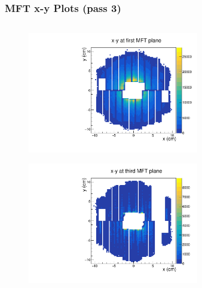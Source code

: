 \documentclass[10pt]{beamer}
\begin{document}
\begin{frame}
    \frametitle{MFT x-y Plots (pass 3)}

    \begin{columns}[T]
        \begin{column}{0.5\textwidth}
            \vspace*{-0.5cm}
            \begin{figure}
                \begin{center}
                    \includegraphics[width=0.7\textwidth]{Plots/pass3_MFT/x_y_1_pass3.pdf}
                \end{center}
            \end{figure}
            \vspace*{-0.7cm}
            \begin{figure}
                \begin{center}
                    \includegraphics[width=0.7\textwidth]{Plots/pass3_MFT/x_y_3_pass3.pdf}
                \end{center}
            \end{figure}
        \end{column}
        \begin{column}{0.5\textwidth}
            \vspace*{-0.5cm}

\end{column}
\end{columns}
\end{frame}
\end{document}
